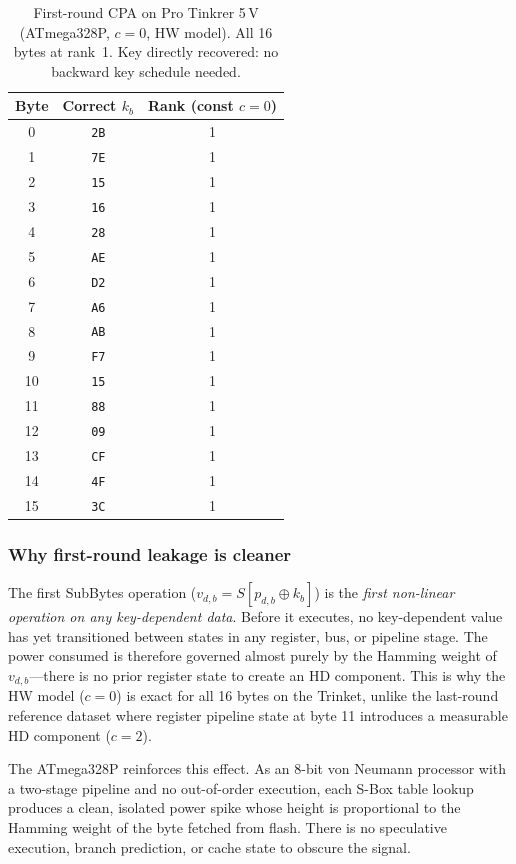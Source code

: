 \begin{table}[H]
\centering
\caption{First-round CPA on Pro Tinkrer 5\,V (ATmega328P, $c=0$, HW model).
         All 16 bytes at rank~1.
         Key directly recovered: no backward key schedule needed.}
\label{tab:trinket_cpa}
\begin{tabular}{@{}ccc@{}}
\toprule
Byte & Correct $k_{b}$ & Rank (const $c=0$) \\
\midrule
 0  & \texttt{2B} & 1 \\
 1  & \texttt{7E} & 1 \\
 2  & \texttt{15} & 1 \\
 3  & \texttt{16} & 1 \\
 4  & \texttt{28} & 1 \\
 5  & \texttt{AE} & 1 \\
 6  & \texttt{D2} & 1 \\
 7  & \texttt{A6} & 1 \\
 8  & \texttt{AB} & 1 \\
 9  & \texttt{F7} & 1 \\
10  & \texttt{15} & 1 \\
11  & \texttt{88} & 1 \\
12  & \texttt{09} & 1 \\
13  & \texttt{CF} & 1 \\
14  & \texttt{4F} & 1 \\
15  & \texttt{3C} & 1 \\
\bottomrule
\end{tabular}
\end{table}

\subsubsection*{Why first-round leakage is cleaner}

The first SubBytes operation ($v_{d,b} = S[p_{d,b} \oplus k_b]$) is the
\emph{first non-linear operation on any key-dependent data}.
Before it executes, no key-dependent value has yet transitioned between
states in any register, bus, or pipeline stage.
The power consumed is therefore governed almost purely by the
Hamming weight of $v_{d,b}$---there is no prior register state to create
an HD component.
This is why the HW model ($c=0$) is exact for all 16 bytes on the Trinket,
unlike the last-round reference dataset where register pipeline state
at byte 11 introduces a measurable HD component ($c=2$).

The ATmega328P reinforces this effect.
As an 8-bit von Neumann processor with a two-stage pipeline and no
out-of-order execution, each S-Box table lookup produces a clean,
isolated power spike whose height is proportional to the
Hamming weight of the byte fetched from flash.
There is no speculative execution, branch prediction, or cache state
to obscure the signal.

